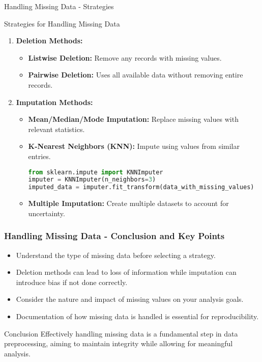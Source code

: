 \documentclass[aspectratio=169]{beamer}
\begin{document}
\begin{frame}[fragile]{Handling Missing Data - Strategies}
    \begin{block}{Strategies for Handling Missing Data}
        \begin{enumerate}
            \item \textbf{Deletion Methods:}
                \begin{itemize}
                    \item \textbf{Listwise Deletion:} Remove any records with missing values.
                    \item \textbf{Pairwise Deletion:} Uses all available data without removing entire records.
                \end{itemize}
            \item \textbf{Imputation Methods:}
                \begin{itemize}
                    \item \textbf{Mean/Median/Mode Imputation:} Replace missing values with relevant statistics.
                    \item \textbf{K-Nearest Neighbors (KNN):} Impute using values from similar entries.
                    \begin{lstlisting}[language=Python]
from sklearn.impute import KNNImputer
imputer = KNNImputer(n_neighbors=3)
imputed_data = imputer.fit_transform(data_with_missing_values)
                    \end{lstlisting}
                    \item \textbf{Multiple Imputation:} Create multiple datasets to account for uncertainty.
                \end{itemize}
        \end{enumerate}
    \end{block}
\end{frame}

\begin{frame}[fragile]
    \frametitle{Handling Missing Data - Conclusion and Key Points}
    \begin{itemize}
        \item Understand the type of missing data before selecting a strategy.
        \item Deletion methods can lead to loss of information while imputation can introduce bias if not done correctly.
        \item Consider the nature and impact of missing values on your analysis goals.
        \item Documentation of how missing data is handled is essential for reproducibility.
    \end{itemize}
    \begin{block}{Conclusion}
        Effectively handling missing data is a fundamental step in data preprocessing, aiming to maintain integrity while allowing for meaningful analysis.
    \end{block}
\end{frame}
\end{document}
